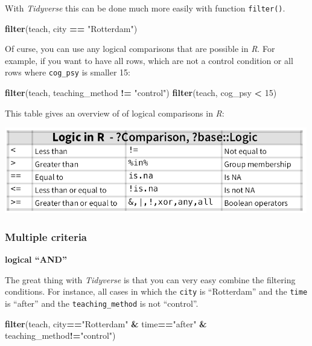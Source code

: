 \documentclass[
]{scrartcl}
\newenvironment{Shaded}{\begin{snugshade}}{\end{snugshade}}
\newcommand{\DecValTok}[1]{\textcolor[rgb]{0.00,0.00,0.81}{#1}}
\newcommand{\FunctionTok}[1]{\textcolor[rgb]{0.13,0.29,0.53}{\textbf{#1}}}
\newcommand{\NormalTok}[1]{#1}
\newcommand{\SpecialCharTok}[1]{\textcolor[rgb]{0.81,0.36,0.00}{\textbf{#1}}}
\newcommand{\StringTok}[1]{\textcolor[rgb]{0.31,0.60,0.02}{#1}}
\begin{document}
With \emph{Tidyverse} this can be done much more easily with function \texttt{filter()}.

\begin{Shaded}
\begin{Highlighting}[]
\FunctionTok{filter}\NormalTok{(teach, city }\SpecialCharTok{==} \StringTok{"Rotterdam"}\NormalTok{)}
\end{Highlighting}
\end{Shaded}

Of curse, you can use any logical comparisons that are possible in \emph{R}. For example, if you want to have all rows, which are not a control condition or all rows where \texttt{cog\_psy} is smaller 15:

\begin{Shaded}
\begin{Highlighting}[]
\FunctionTok{filter}\NormalTok{(teach, teaching\_method }\SpecialCharTok{!=} \StringTok{"control"}\NormalTok{)}
\FunctionTok{filter}\NormalTok{(teach, cog\_psy }\SpecialCharTok{\textless{}} \DecValTok{15}\NormalTok{)}
\end{Highlighting}
\end{Shaded}

This table gives an overview of of logical comparisons in \emph{R}:

\begin{center}\includegraphics[width=500px]{images/logic_in_r} \end{center}

\subsubsection{Multiple criteria}\label{multiple-criteria}

\textbf{logical ``AND''}

The great thing with \emph{Tidyverse} is that you can very easy combine the filtering conditions. For instance, all cases in which the \texttt{city} is ``Rotterdam'' and the \texttt{time} is ``after'' and the \texttt{teaching\_method} is not ``control''.

\begin{Shaded}
\begin{Highlighting}[]
\FunctionTok{filter}\NormalTok{(teach, city}\SpecialCharTok{==}\StringTok{"Rotterdam"} \SpecialCharTok{\&}\NormalTok{ time}\SpecialCharTok{==}\StringTok{"after"} \SpecialCharTok{\&}\NormalTok{ teaching\_method}\SpecialCharTok{!=}\StringTok{"control"}\NormalTok{)}
\end{Highlighting}
\end{Shaded}
\end{document}
